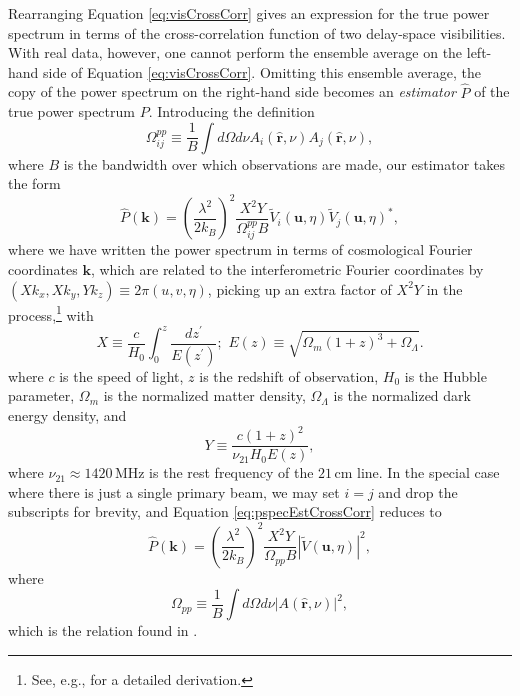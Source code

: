 \documentclass[twocolumn,apj,numberedappendix]{emulateapj}
\newcommand{\rhat}{\hat{\mathbf{r}}}
\begin{document}
Rearranging Equation \eqref{eq:visCrossCorr} gives an expression for the true power spectrum in terms of the cross-correlation function of two delay-space visibilities. With real data, however, one cannot perform the ensemble average on the left-hand side of Equation \eqref{eq:visCrossCorr}. Omitting this ensemble average, the copy of the power spectrum on the right-hand side becomes an \emph{estimator} $\widehat{P}$ of the true power spectrum $P$. Introducing the definition
\begin{equation}
\label{eq:Omega_ij_def}
\Omega_{ij}^{pp} \equiv \frac{1}{B} \int d\Omega d\nu A_i (\rhat,\nu) A_j (\rhat,\nu),
\end{equation}
where $B$ is the bandwidth over which observations are made, our estimator takes the form
\begin{equation}
\label{eq:pspecEstCrossCorr}
\widehat{P} (\mathbf{k}) = \left( \frac{\lambda^2}{2 k_B} \right)^2 \frac{X^2 Y}{\Omega^{pp}_{ij} B} \widetilde{V}_i(\mathbf{u},\eta) \widetilde{V}_j(\mathbf{u},\eta)^*,
\end{equation}
where we have written the power spectrum in terms of cosmological Fourier coordinates $\mathbf{k}$, which are related to the interferometric Fourier coordinates by $(X k_x, X k_y, Y k_z) \equiv 2 \pi (u , v, \eta)$, picking up an extra factor of $X^2 Y$ in the process,\footnote{See, e.g., \citet{liu_et_al2014a} for a detailed derivation.} with
\begin{equation}
X \equiv \frac{c}{H_0} \int_0^z \frac{dz^\prime}{E(z^\prime)}; \,\, E(z) \equiv \sqrt{\Omega_m (1+z)^3 + \Omega_\Lambda}.
\end{equation}
where $c$ is the speed of light, $z$ is the redshift of observation, $H_0$ is the Hubble parameter, $\Omega_m$ is the normalized matter density, $\Omega_\Lambda$ is the normalized dark energy density, and
\begin{equation}
Y \equiv  \frac{c(1+z)^2}{\nu_{21} H_0 E(z)},
\end{equation}
where $\nu_{21} \approx 1420\,\textrm{MHz}$ is the rest frequency of the $21\,\textrm{cm}$ line. In the special case where there is just a single primary beam, we may set $i=j$ and drop the subscripts for brevity, and Equation \eqref{eq:pspecEstCrossCorr} reduces to
\begin{equation}
\label{eq:P14est}
\widehat{P} (\mathbf{k}) = \left( \frac{\lambda^2}{2 k_B} \right)^2 \frac{X^2 Y}{\Omega_{pp} B} | \widetilde{V}(\mathbf{u},\eta) |^2,
\end{equation}
where
\begin{equation}
\Omega_{pp} \equiv \frac{1}{B} \int d\Omega d\nu |A (\rhat,\nu)|^2,
\end{equation}
which is the relation found in \citet{P14}.
\end{document}
